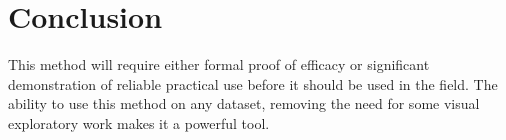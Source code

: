\documentclass[a4paperpaper,twocolumn]{article}
\begin{document}
\section{Conclusion}\label{Conclusion}

This method will require either formal proof of efficacy or significant demonstration of reliable practical use before it should be used in the field. The ability to use this method on any dataset, removing the need for some visual exploratory work makes it a powerful tool.

\printbibliography
\end{document}

